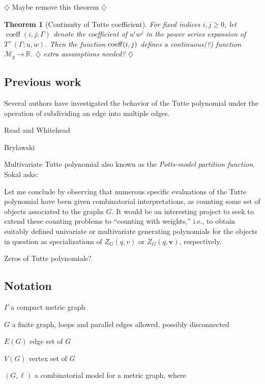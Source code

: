 \documentclass{amsart}
\newtheorem{thm}{Theorem}
\theoremstyle{definition}
\newcommand{\RR}{\mathbb{R}}
\DeclareMathOperator{\coeff}{coeff}
\newcommand{\harry}[1]{{\color{red} \sf $\diamondsuit$  {#1} $\diamondsuit$ }}
\newcommand{\note}[1]{\harry{#1}}
\begin{document}
\note{Maybe remove this theorem}
\begin{thm}[Continuity of Tutte coefficient]
For fixed indices $i,j\geq 0$,
let $\coeff(i,j; \Gamma)$
denote the coefficient of $u^i w^j$ in the power series expansion of $T^+(\Gamma; u,w)$.
Then the function ${\rm coeff}(i,j)$
defines a continuous(?) 
function $\mathcal M_g \to \RR$.
\note{extra assumptions needed?}
\end{thm}

\subsection{Previous work} 

Several authors have investigated the behavior of the Tutte polynomial under the operation of subdividing an edge into multiple edges.

Read and Whitehead \cite{RW2}

Brylawski \cite{Bry}

\cite{Tra1,Tra2,Tra3}

\cite{RW1,RW2}

Multivariate Tutte polynomial \cite{Sok-potts}
also known as the {\em Potts-model partition function}.
Sokal \cite{Sok-potts} asks:
\begin{displayquote}
Let me conclude by observing that numerous specific evaluations of the Tutte polynomial have been given combinatorial interpretations, 
as counting some set of objects associated to the graphs $G$. 
It would be an interesting project to seek to extend these counting problems to ``counting with weights,''
i.e., to obtain suitably defined univariate or multivariate generating polynomials for the objects in question as specializations of 
$Z_G(q,v)$ or $Z_G(q,\mathbf{v})$, respectively.
\end{displayquote}
Zeros of Tutte polynomials?

\subsection{Notation}

$\Gamma$ a compact metric graph

$G$ a finite graph, 
loops and parallel edges allowed,
possibly disconnected

$E(G)$ edge set of $G$

$V(G)$ vertex set of $G$

$(G,\ell)$ a combinatorial model for a metric graph,
where 
\end{document}
